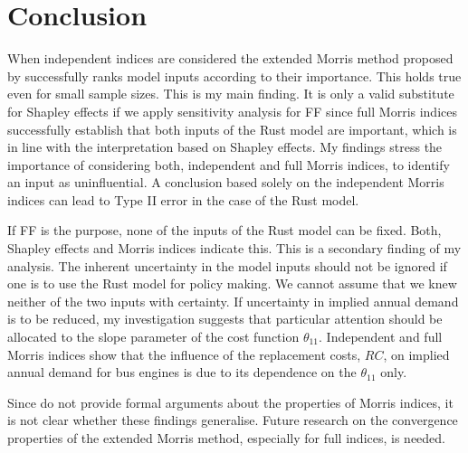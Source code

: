 \section{Conclusion} \label{conclusion}



When independent indices are considered the extended Morris method proposed by \citet{GM17} successfully ranks model inputs according to their importance. This holds true even for small sample sizes. This is my main finding. It is only a valid substitute for Shapley effects if we apply sensitivity analysis for FF since full Morris indices successfully establish that both inputs of the Rust model are important, which is in line with the interpretation based on Shapley effects. My findings stress the importance of considering both, independent and full Morris indices, to identify an input as uninfluential. A conclusion based solely on the independent Morris indices can lead to Type II error in the case of the Rust model.


If FF is the purpose, none of the inputs of the Rust model can be fixed. Both, Shapley effects and Morris indices indicate this. This is a secondary finding of my analysis. The inherent uncertainty in the model inputs should not be ignored if one is to use the Rust model for policy making. We cannot assume that we knew neither of the two inputs with certainty. If uncertainty in implied annual demand is to be reduced, my investigation suggests that particular attention should be allocated to the slope parameter of the cost function $\theta_{11}$. Independent and full Morris indices show that the influence of the replacement costs, $RC$, on implied annual demand for bus engines is due to its dependence on the $\theta_{11}$ only.


Since \citet{GM17} do not provide formal arguments about the properties of Morris indices, it is not clear whether these findings generalise. Future research on the convergence properties of the extended Morris method, especially for full indices, is needed.

